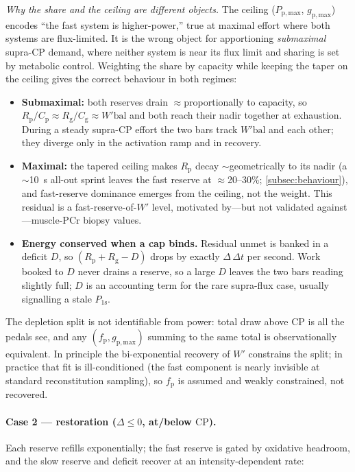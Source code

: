 \documentclass[11pt,a4paper]{article}
\newcommand{\Wp}{\ensuremath{W'}}
\newcommand{\Wbal}{\ensuremath{W'\!\text{bal}}}
\newcommand{\CP}{\ensuremath{\mathrm{CP}}}
\newcommand{\fp}{\ensuremath{f_{\mathrm p}}}
\newcommand{\Rp}{\ensuremath{R_{\mathrm p}}}
\newcommand{\Rg}{\ensuremath{R_{\mathrm g}}}
\newcommand{\Cp}{\ensuremath{C_{\mathrm p}}}
\newcommand{\Cg}{\ensuremath{C_{\mathrm g}}}
\newcommand{\Ppmax}{\ensuremath{P_{\mathrm{p,max}}}}
\newcommand{\gpmax}{\ensuremath{g_{\mathrm{p,max}}}}
\newcommand{\Pos}{\ensuremath{P_{1\mathrm s}}}
\begin{document}
\emph{Why the share and the ceiling are different objects.} The ceiling ($\Ppmax$, $\gpmax$) encodes ``the
fast system is higher-power,'' true at maximal effort where both systems are flux-limited. It is the wrong
object for apportioning \emph{submaximal} supra-\CP{} demand, where neither system is near its flux limit
and sharing is set by metabolic control. Weighting the share by capacity while keeping the taper on the
ceiling gives the correct behaviour in both regimes:

\begin{itemize}[leftmargin=1.4em,itemsep=2pt]
\item \textbf{Submaximal:} both reserves drain $\approx$proportionally to capacity, so
$\Rp/\Cp \approx \Rg/\Cg \approx \Wbal$ and both reach their nadir together at exhaustion. During a steady
supra-\CP{} effort the two bars track \Wbal{} and each other; they diverge only in the activation ramp and
in recovery.
\item \textbf{Maximal:} the tapered ceiling makes \Rp{} decay $\sim$geometrically to its nadir (a
$\sim$10~s all-out sprint leaves the fast reserve at $\approx$20--30\%; \cref{subsec:behaviour}), and
fast-reserve dominance emerges from the ceiling, not the weight. This residual is a fast-reserve-of-\Wp{}
level, motivated by---but not validated against---muscle-PCr biopsy values.
\item \textbf{Energy conserved when a cap binds.} Residual $\mathrm{unmet}$ is banked in a deficit $D$, so
$(\Rp + \Rg - D)$ drops by exactly $\Delta\,\Delta t$ per second. Work booked to $D$ never drains a
reserve, so a large $D$ leaves the two bars reading slightly full; $D$ is an accounting term for the rare
supra-flux case, usually signalling a stale \Pos.
\end{itemize}

The depletion split is not identifiable from power: total draw above \CP{} is all the pedals see, and any
$(\fp, \gpmax)$ summing to the same total is observationally equivalent. In principle the bi-exponential
recovery of \Wp{} constrains the split; in practice that fit is ill-conditioned (the fast component is
nearly invisible at standard reconstitution sampling), so \fp{} is assumed and weakly constrained, not
recovered.

\paragraph{Case 2 --- restoration ($\Delta \le 0$, at/below \CP).} Each reserve refills exponentially; the
fast reserve is gated by oxidative headroom, and the slow reserve and deficit recover at an
intensity-dependent rate:
\end{document}
